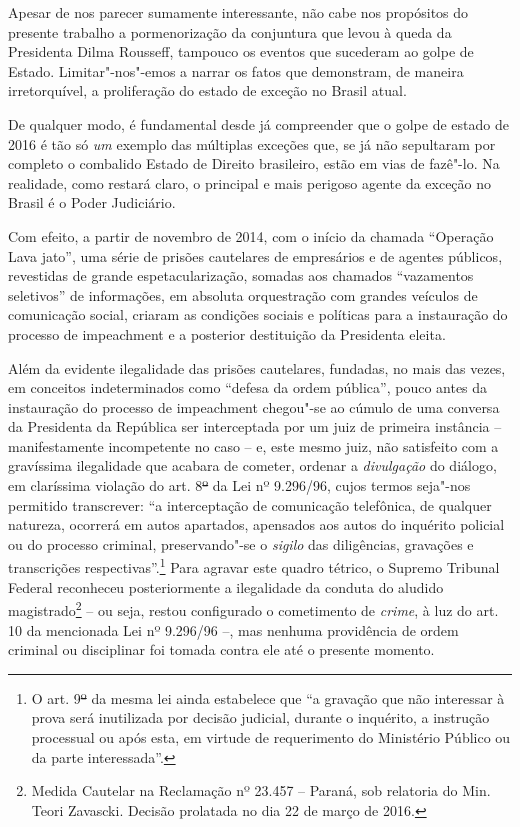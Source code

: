 Apesar de nos parecer sumamente interessante, não cabe nos propósitos do
presente trabalho a pormenorização da conjuntura que levou à queda da
Presidenta Dilma Rousseff, tampouco os eventos que sucederam ao golpe de
Estado. Limitar"-nos"-emos a narrar os fatos que demonstram, de maneira
irretorquível, a proliferação do estado de exceção no Brasil atual.

De qualquer modo, é fundamental desde já compreender que o golpe de
estado de 2016 é tão só \emph{um} exemplo das múltiplas exceções que, se
já não sepultaram por completo o combalido Estado de Direito brasileiro,
estão em vias de fazê"-lo. Na realidade, como restará claro, o principal
e mais perigoso agente da exceção no Brasil é o Poder Judiciário.

Com efeito, a partir de novembro de 2014, com o início da chamada
``Operação Lava jato'', uma série de prisões cautelares de empresários e
de agentes públicos, revestidas de grande espetacularização, somadas aos
chamados ``vazamentos seletivos'' de informações, em absoluta
orquestração com grandes veículos de comunicação social, criaram as
condições sociais e políticas para a instauração do processo de
impeachment e a posterior destituição da Presidenta eleita.

Além da evidente ilegalidade das prisões cautelares, fundadas, no mais
das vezes, em conceitos indeterminados como ``defesa da ordem pública'',
pouco antes da instauração do processo de impeachment chegou"-se
ao cúmulo de uma conversa da Presidenta da República ser interceptada
por um juiz de primeira instância -- manifestamente incompetente no caso
-- e, este mesmo juiz, não satisfeito com a gravíssima ilegalidade que
acabara de cometer, ordenar a \emph{divulgação} do diálogo, em
claríssima violação do art. 8\sout{º} da Lei nº 9.296/96, cujos termos
seja"-nos permitido transcrever: ``a interceptação de comunicação
telefônica, de qualquer natureza, ocorrerá em autos apartados, apensados
aos autos do inquérito policial ou do processo criminal, preservando"-se
o \emph{sigilo} das diligências, gravações e transcrições
respectivas''.\footnote{O art. 9\sout{º} da mesma lei ainda estabelece
  que ``a gravação que não interessar à prova será inutilizada por
  decisão judicial, durante o inquérito, a instrução processual ou após
  esta, em virtude de requerimento do Ministério Público ou da parte
  interessada''.} Para agravar este quadro tétrico, o Supremo Tribunal
Federal reconheceu posteriormente a ilegalidade da conduta do aludido
magistrado\footnote{Medida Cautelar na Reclamação nº 23.457 -- Paraná,
  sob relatoria do Min. Teori Zavascki. Decisão prolatada no dia 22 de
  março de 2016.} -- ou seja, restou configurado o cometimento de
\emph{crime}, à luz do art. 10 da mencionada Lei nº 9.296/96 --, mas
nenhuma providência de ordem criminal ou disciplinar foi tomada contra
ele até o presente momento.

